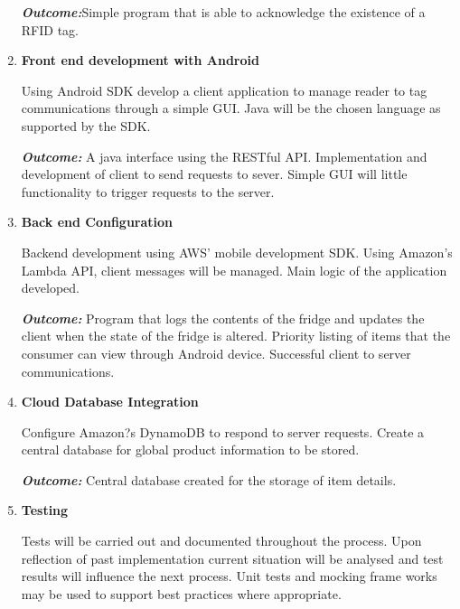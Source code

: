 \documentclass[a4paper, 11pt]{article}
\begin{document}
\begin{enumerate}
\begin{flushleft}
	\emph{\textbf{Outcome:}}Simple program that is able to  acknowledge the existence of a RFID tag. 
		  \vspace{\baselineskip}

  	\end{flushleft}
	   \item \textbf{Front end development with Android}
   	\begin{flushleft}Using Android SDK develop a client application to manage reader to tag communications through a simple GUI. Java will be the chosen language as supported by the SDK.
	
	\emph{\textbf{Outcome:}} A java interface using the RESTful API. Implementation and development of client to send requests to sever. Simple GUI will little functionality to trigger requests to the server. 	
	\end{flushleft}
	\vspace{\baselineskip}
 
   \item \textbf{Back end Configuration }
   	\begin{flushleft}Backend development using AWS' mobile development SDK. Using Amazon's Lambda API, client messages will be managed. Main logic of the application developed.
	
	\emph{\textbf{Outcome:}} Program that logs the contents of the fridge and updates the client when the state of the fridge is altered. Priority listing of items that the consumer can view through Android device. Successful client to server communications.
	\vspace{\baselineskip}
  	\end{flushleft}
	   \item \textbf{Cloud Database Integration}
   	\begin{flushleft} Configure Amazon?s DynamoDB to respond to server requests. Create a central database for global product information to be stored.
	
	\emph{\textbf{Outcome:}} Central database created for the storage of item details.
	\vspace{\baselineskip}
  	\end{flushleft}
	 
   \item \textbf{Testing}
   	\begin{flushleft}Tests will be carried out and documented throughout the process. Upon reflection of past implementation current situation will be analysed and test results will influence the next process. Unit tests and mocking frame works may be used to support best practices where appropriate.
	  	

\end{flushleft}
\end{enumerate}
\end{document}

